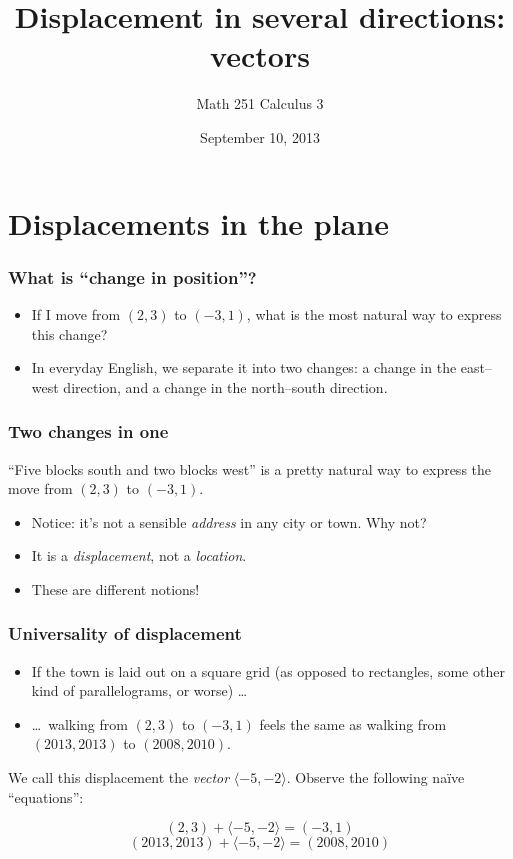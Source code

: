 \documentclass[11pt,ignorenonframetext,aspectratio=169]{beamer}
\title{Displacement in several directions: vectors}
\author{Math 251 Calculus 3}
\date{September 10, 2013 }
\begin{document}
\frame{\titlepage}

\section{Displacements in the plane}

\begin{frame}\frametitle{What is ``change in position''?}

\begin{itemize}[<+->]
\item
  If I move from $(2,3)$ to $(-3, 1)$, what is the most natural way to
  express this change?
\item
  In everyday English, we separate it into two changes: a change in the
  east--west direction, and a change in the north--south direction.
\end{itemize}

\end{frame}

\begin{frame}\frametitle{Two changes in one}

``Five blocks south and two blocks west'' is a pretty natural way to
express the move from $(2,3)$ to $(-3, 1)$.

\begin{itemize}

\item
  Notice: it's not a sensible \emph{address} in any city or town. Why
  not?
\item
  It is a \emph{displacement}, not a \emph{location}.
\item
  These are different notions!
\end{itemize}

\end{frame}

\begin{frame}\frametitle{Universality of displacement}

\begin{itemize}

\item
  If the town is laid out on a square grid (as opposed to rectangles,
  some other kind of parallelograms, or worse) \ldots
\item
  \ldots~walking from $(2,3)$ to $(-3, 1)$ feels the same as walking
  from $(2013,2013)$ to $(2008,2010)$.
\end{itemize}

We call this displacement the \emph{vector} $\langle -5, -2 \rangle$.
Observe the following na\"ive ``equations'':

\begin{equation*}
(2,3) + \langle -5, -2 \rangle = (-3, 1)
\end{equation*}
\begin{equation*}
(2013,2013) + \langle -5, -2 \rangle = (2008,2010)
\end{equation*}

\end{frame}
\end{document}
